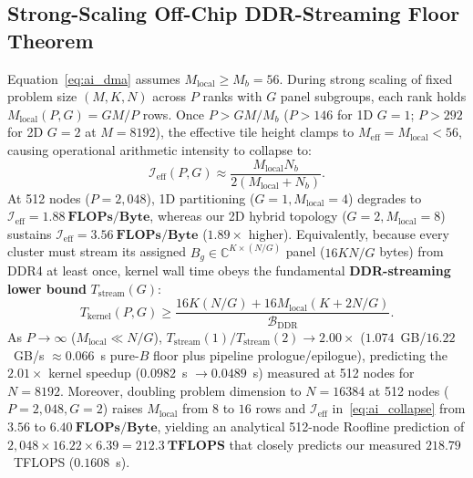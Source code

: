 \documentclass[conference]{IEEEtran}
\begin{document}
\subsection{Strong-Scaling Off-Chip DDR-Streaming Floor Theorem}
Equation~\eqref{eq:ai_dma} assumes $M_{\mathrm{local}} \ge M_b = 56$. During strong scaling of fixed problem size $(M, K, N)$ across $P$ ranks with $G$ panel subgroups, each rank holds $M_{\mathrm{local}}(P, G) = G M / P$ rows. Once $P > G M / M_b$ ($P > 146$ for 1D $G=1$; $P > 292$ for 2D $G=2$ at $M=8192$), the effective tile height clamps to $M_{\mathrm{eff}} = M_{\mathrm{local}} < 56$, causing operational arithmetic intensity to collapse to:
\begin{equation}
\mathcal{I}_{\mathrm{eff}}(P, G) \approx \frac{M_{\mathrm{local}} N_b}{2\left(M_{\mathrm{local}} + N_b\right)}.
\label{eq:ai_collapse}
\end{equation}
At 512 nodes ($P = 2{,}048$), 1D partitioning ($G=1, M_{\mathrm{local}}=4$) degrades to $\mathcal{I}_{\mathrm{eff}} = \mathbf{1.88~\text{FLOPs/Byte}}$, whereas our 2D hybrid topology ($G=2, M_{\mathrm{local}}=8$) sustains $\mathcal{I}_{\mathrm{eff}} = \mathbf{3.56~\text{FLOPs/Byte}}$ ($1.89\times$ higher). Equivalently, because every cluster must stream its assigned $B_g \in \mathbb{C}^{K \times (N/G)}$ panel ($16 K N / G$ bytes) from DDR4 at least once, kernel wall time obeys the fundamental \textbf{DDR-streaming lower bound} $T_{\mathrm{stream}}(G)$:
\begin{equation}
T_{\mathrm{kernel}}(P, G) \ge \frac{16 K (N / G) + 16 M_{\mathrm{local}}(K + 2 N / G)}{\mathcal{B}_{\mathrm{DDR}}}.
\label{eq:ddr_floor}
\end{equation}
As $P \to \infty$ ($M_{\mathrm{local}} \ll N/G$), $T_{\mathrm{stream}}(1) / T_{\mathrm{stream}}(2) \to \mathbf{2.00\times}$ ($1.074$~GB/$16.22$~GB/s $\approx 0.066$~s pure-$B$ floor plus pipeline prologue/epilogue), predicting the $2.01\times$ kernel speedup ($0.0982$~s $\to 0.0489$~s) measured at 512 nodes for $N=8192$. Moreover, doubling problem dimension to $N=16384$ at 512 nodes ($P=2{,}048, G=2$) raises $M_{\mathrm{local}}$ from $8$ to $16$ rows and $\mathcal{I}_{\mathrm{eff}}$ in~\eqref{eq:ai_collapse} from $3.56$ to $\mathbf{6.40~\text{FLOPs/Byte}}$, yielding an analytical 512-node Roofline prediction of $2{,}048 \times 16.22 \times 6.39 = \mathbf{212.3~\text{TFLOPS}}$ that closely predicts our measured $218.79$~TFLOPS ($0.1608$~s).

\end{document}
